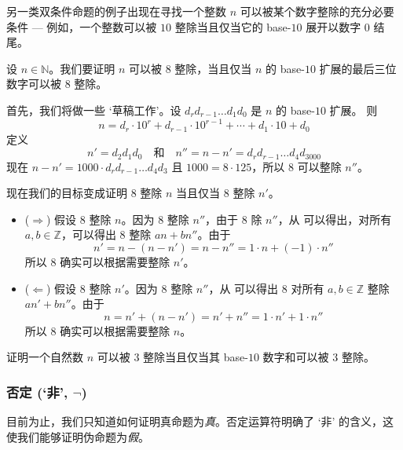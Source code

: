 另一类双条件命题的例子出现在寻找一个整数 $n$ 可以被某个数字整除的充分必要条件 --- 例如，一个整数可以被 $10$ 整除当且仅当它的 base-$10$ 展开以数字 $0$ 结尾。

\begin{example}
\label{exTestForDivisibilityByEight}
设 $n \in \mathbb{N}$。我们要证明 $n$ 可以被 $8$ 整除，当且仅当 $n$ 的 base-$10$ 扩展的最后三位数字可以被 $8$ 整除。

首先，我们将做一些 `草稿工作'。设 $d_rd_{r-1}\dots{}d_1d_0$ 是 $n$ 的 base-$10$ 扩展。 则
\[
n = d_r \cdot 10^r + d_{r-1} \cdot 10^{r-1} + \cdots + d_1 \cdot 10 + d_0
\]
定义
\[
n' = d_2d_1d_0 \quad \text{和} \quad n'' = n-n' = d_rd_{r-1}\dots{}d_4d_3000
\]
现在 $n-n' = 1000 \cdot d_rd_{r-1} \dots d_4d_3$ 且 $1000 = 8 \cdot 125$，所以 $8$ 可以整除 $n''$。

现在我们的目标变成证明 $8$ 整除 $n$ 当且仅当 $8$ 整除 $n'$。

\begin{itemize}
\item ($\Rightarrow$) 假设 $8$ 整除 $n$。因为 $8$ 整除 $n''$，由于 $8$ 除 $n''$，从  可以得出，对所有 $a,b \in \mathbb{Z}$，可以得出 $8$ 整除 $an+bn''$。由于
\[
n' = n-(n-n') = n-n'' = 1 \cdot n + (-1) \cdot n''
\]
所以 $8$ 确实可以根据需要整除 $n'$。
\item ($\Leftarrow$)  假设 $8$ 整除 $n'$。因为 $8$ 整除 $n''$，从  可以得出 $8$ 对所有 $a,b \in \mathbb{Z}$ 整除 $an'+bn''$。由于
\[
n = n'+(n-n') = n'+n'' = 1 \cdot n' + 1 \cdot n''
\]
所以 $8$ 确实可以根据需要整除 $n$。
\end{itemize}
\end{example}

\begin{exercise}
证明一个自然数 $n$ 可以被 $3$ 整除当且仅当其 base-$10$ 数字和可以被 $3$ 整除。
\end{exercise}

\subsubsection*{否定 (`非', $\neg$)}

目前为止，我们只知道如何证明真命题为\textit{真}。否定运算符明确了 `非' 的含义，这使我们能够证明伪命题为\textit{假}。

